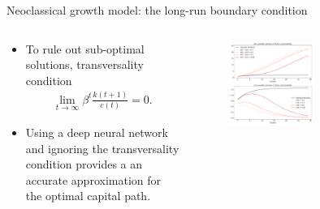 \documentclass[aspectratio=169,10pt]{beamer}
\begin{document}
\begin{frame}{Neoclassical growth model: the long-run boundary condition}
	\begin{columns}
		\begin{column}{0.4\textwidth}
			\begin{itemize}
				\item To rule out sub-optimal solutions, transversality condition
				\begin{align*}
					\lim_{t\rightarrow \infty}\beta^t \frac{k(t+1)}{c(t)} = 0.
				\end{align*}
				\vspace{0.1in}
				\item  Using a deep neural network and ignoring the transversality condition provides a an accurate approximation for the optimal capital path.
			\end{itemize}
		\end{column}
		\begin{column}{0.7\textwidth}
			\vspace{-10mm}
			\begin{figure}[t!]
				\centering
				\includegraphics[width=0.55\textwidth]{figs/TVC_violation.pdf}
				\vspace{-7mm}
			\end{figure}
		\end{column}
	\end{columns}
\end{frame}
\end{document}
